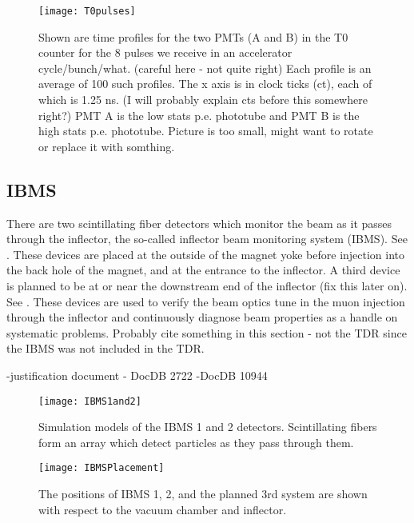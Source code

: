 \begin{figure}[]
    \centering
    \texttt{[image: T0pulses]}
    \caption[T0 Pulses]{Shown are time profiles for the two PMTs (A and B) in the T0 counter for the 8 pulses we receive in an accelerator cycle/bunch/what. (careful here - not quite right) Each profile is an average of 100 such profiles. The x axis is in clock ticks (ct), each of which is 1.25 ns. (I will probably explain cts before this somewhere right?) PMT A is the low stats p.e. phototube and PMT B is the high stats p.e. phototube. Picture is too small, might want to rotate or replace it with somthing.}
    \label{fig:T0pulses}
\end{figure}


\subsection{IBMS}
\label{sec:IBMS}

There are two scintillating fiber detectors which monitor the beam as it passes through the inflector, the so-called inflector beam monitoring system (IBMS). See . These devices are placed at the outside of the magnet yoke before injection into the back hole of the magnet, and at the entrance to the inflector. A third device is planned to be at or near the downstream end of the inflector (fix this later on). See . These devices are used to verify the beam optics tune in the muon injection through the inflector and continuously diagnose beam properties as a handle on systematic problems. Probably cite something in this section - not the TDR since the IBMS was not included in the TDR.

-justification document - DocDB 2722
-DocDB 10944


\begin{figure}[]
    \centering
    \texttt{[image: IBMS1and2]}
    \caption[IBMS Models]{Simulation models of the IBMS 1 and 2 detectors. Scintillating fibers form an array which detect particles as they pass through them.}   
    \label{fig:IBMS1and2}
\end{figure}

\begin{figure}[]
    \centering
    \texttt{[image: IBMSPlacement]}
    \caption[IBMS Positions]{The positions of IBMS 1, 2, and the planned 3rd system are shown with respect to the vacuum chamber and inflector.}   
    \label{fig:IBMSPlacement}
\end{figure}


